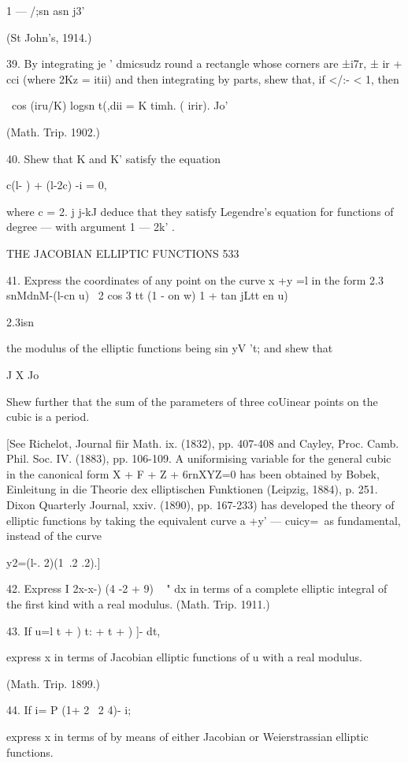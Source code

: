 1 — /;sn asn j3'

(St John's, 1914.)

39. By integrating je ' dmicsudz round a rectangle whose corners are
±i7r, ± ir + cci (where 2Kz = itii) and then integrating by parts,
shew that, if </:- < 1, then

\ cos (iru/K) logsn t(,dii = K timh. ( irir). Jo'

(Math. Trip. 1902.)

40. Shew that K and K' satisfy the equation

c(l- ) + (l-2c) -i = 0,

where c = 2. j j-kJ deduce that they satisfy Legendre's equation for
functions of degree — with argument 1 — 2k' .

THE JACOBIAN ELLIPTIC FUNCTIONS 533

41. Express the coordinates of any point on the curve x +y =l in the
form 2.3 snMdnM-(l-cn u) \ 2 cos 3 tt (1 - on w) 1 + tan jLtt en u)

2.3isn%

the modulus of the elliptic functions being sin yV 't; and shew that

J X Jo

Shew further that the sum of the parameters of three coUinear points
on the cubic is a period.

[See Richelot, Journal fiir Math. ix. (1832), pp. 407-408 and Cayley,
Proc. Camb. Phil. Soc. IV. (1883), pp. 106-109. A uniformising
variable for the general cubic in the canonical form X + F + Z +
6rnXYZ=0 has been obtained by Bobek, Einleitung in die Theorie dex
elliptischen Funktionen (Leipzig, 1884), p. 251. Dixon Quarterly
Journal, xxiv. (1890), pp. 167-233) has developed the theory of
elliptic functions by taking the equivalent curve a +y' — cuicy=\ as
fundamental, instead of the curve

y2=(l-. 2)(1\ .2 .2).]

42. Express I 2x-x-) (4 -2 + 9) ~ " dx in terms of a complete elliptic
integral of the first kind with a real modulus. (Math. Trip. 1911.)

43. If u=l t + ) t: + t + ) ]- dt,

express x in terms of Jacobian elliptic functions of u with a real
modulus.

(Math. Trip. 1899.)

44. If i= P (1+ 2 \ 2 4)- i;

express x in terms of by means of either Jacobian or Weierstrassian
elliptic functions.

